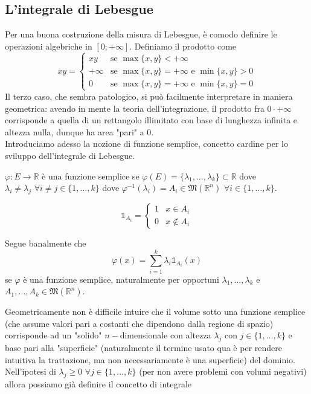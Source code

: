 \subsection{L'integrale di Lebesgue}
Per una buona costruzione della misura di Lebesgue, è comodo definire le operazioni algebriche in $[0; +\infty]$. Definiamo il prodotto come
\begin{equation*}
	xy = \begin{cases}
		xy & \text{se } \max\{x, y \} < +\infty \\
		+\infty & \text{se } \max\{x, y \} = +\infty \text{ e } \min\{x, y \} > 0 \\
		0 & \text{se } \max\{x, y \} = +\infty \text{ e } \min\{x, y \} = 0
	\end{cases}
\end{equation*}
Il terzo caso, che sembra patologico, si può facilmente interpretare in maniera geometrica: avendo in mente la teoria dell'integrazione, il prodotto fra $0 \cdot +\infty$ corrisponde a quella di un rettangolo illimitato con base di lunghezza infinita e
altezza nulla, dunque ha area "pari" a 0. \\
Introduciamo adesso la nozione di funzione semplice, concetto cardine per lo sviluppo dell'integrale di Lebesgue.
\begin{definition}
	$\varphi: E \to \mathbb{R}$ è una funzione semplice se $\varphi(E)=\{\lambda_1, \ldots, \lambda_k \} \subset \mathbb{R}$ dove $\lambda_i \neq \lambda_j \, \, \forall i \neq j \in \{1, \ldots, k \}$ dove
	$\varphi^{-1}(\lambda_i) = A_i \in \mathfrak{M}(\mathbb{R}^n) \, \, \forall i \in \{1, \ldots, k \}$.
\end{definition}
\begin{definition}
	$$
		\mathbb{1}_{A_i} = \begin{cases} 1 & x \in A_i \\ 0 & x \not\in A_i \end{cases}
	$$
\end{definition}
\begin{remark}
Segue banalmente che
$$
\varphi(x) = \sum_{i=1}^k \lambda_i \mathbb{1}_{A_i} (x)
$$
se $\varphi$ è una funzione semplice, naturalmente per opportuni $\lambda_1, \ldots, \lambda_k$ e $A_1, \ldots, A_k \in \mathfrak{M}(\mathbb{R}^n)$.
\end{remark}
Geometricamente non è difficile intuire che il volume sotto una funzione semplice (che assume valori pari a costanti che dipendono dalla regione di spazio) corrisponde ad un "solido" $n-$dimensionale con altezza $\lambda_j$ con $j \in \{1, \ldots, k \}$ e base pari alla "superficie" (naturalmente il termine usato qua è per rendere intuitiva la trattazione, ma non necessariamente è una superficie) 
del dominio. Nell'ipotesi di $\lambda_j \geq 0 \, \, \forall j \in \{1, \ldots, k \}$ (per non avere problemi con volumi negativi) allora possiamo già definire il concetto di integrale

